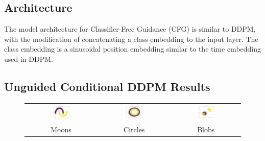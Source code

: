 \documentclass[11pt]{article}
\begin{document}
\subsection{Architecture}

The model architecture for Classifier-Free Guidance (CFG) is similar to DDPM, with the modification of concatenating a class embedding to the input layer. The class embedding is a sinusoidal position embedding similar to the time embedding used in DDPM.

\subsection{Unguided Conditional DDPM Results}

\begin{figure}[H]
    \centering
    \begin{tabular}{ccc}
        \includegraphics[width=0.3\textwidth]{exps/ddpm_2_150_0.0001_0.02_moons/samples_conditional_150.png} &
        \includegraphics[width=0.3\textwidth]{exps/ddpm_2_150_0.0001_0.02_circles/samples_conditional_150.png} &
        \includegraphics[width=0.3\textwidth]{exps/ddpm_2_150_0.0001_0.02_blobs/samples_conditional_150.png} \\
        Moons & Circles & Blobs \\[0.5em]
        

\end{tabular}
\end{figure}
\end{document}
